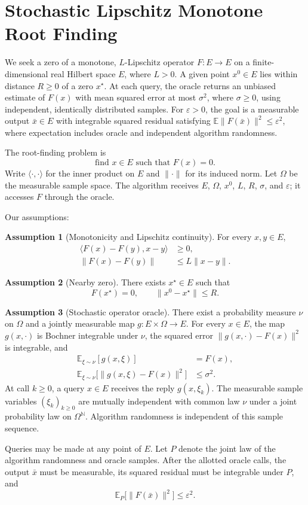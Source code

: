 \documentclass[10pt]{article}
\theoremstyle{definition}
\newtheorem{assumption}{Assumption}
\begin{document}
\section*{Stochastic Lipschitz Monotone Root Finding}
We seek a zero of a monotone, $L$-Lipschitz operator $F:E\to E$ on a finite-dimensional real Hilbert space $E$, where $L>0$. A given point $x^0\in E$ lies within distance $R\geq0$ of a zero $x^\star$. At each query, the oracle returns an unbiased estimate of $F(x)$ with mean squared error at most $\sigma^2$, where $\sigma\geq0$, using independent, identically distributed samples. For $\varepsilon>0$, the goal is a measurable output $\bar{x}\in E$ with integrable squared residual satisfying $\mathbb{E}\|F(\bar{x})\|^2\leq\varepsilon^2$, where expectation includes oracle and independent algorithm randomness.

The root-finding problem is
\[
\text{find }x\in E\text{ such that }F(x)=0.
\]
Write $\langle\cdot,\cdot\rangle$ for the inner product on $E$ and $\|\cdot\|$ for its induced norm. Let $\Omega$ be the measurable sample space. The algorithm receives $E$, $\Omega$, $x^0$, $L$, $R$, $\sigma$, and $\varepsilon$; it accesses $F$ through the oracle.

Our assumptions:
\begin{assumption}[Monotonicity and Lipschitz continuity]
For every $x,y\in E$,
\[
\begin{aligned}
\langle F(x)-F(y),x-y\rangle&\geq0,\\
\|F(x)-F(y)\|&\leq L\|x-y\|.
\end{aligned}
\]
\end{assumption}

\begin{assumption}[Nearby zero]
There exists $x^\star\in E$ such that
\[
F(x^\star)=0,
\qquad \|x^0-x^\star\|\leq R.
\]
\end{assumption}

\begin{assumption}[Stochastic operator oracle]
There exist a probability measure $\nu$ on $\Omega$ and a jointly measurable map $g:E\times\Omega\to E$. For every $x\in E$, the map $g(x,\cdot)$ is Bochner integrable under $\nu$, the squared error $\|g(x,\cdot)-F(x)\|^2$ is integrable, and
\[
\begin{aligned}
\mathbb{E}_{\xi\sim\nu}[g(x,\xi)]&=F(x),\\
\mathbb{E}_{\xi\sim\nu}\bigl[\|g(x,\xi)-F(x)\|^2\bigr]&\leq\sigma^2.
\end{aligned}
\]
At call $k\geq0$, a query $x\in E$ receives the reply $g(x,\xi_k)$. The measurable sample variables $(\xi_k)_{k\geq0}$ are mutually independent with common law $\nu$ under a joint probability law on $\Omega^{\mathbb{N}}$. Algorithm randomness is independent of this sample sequence.
\end{assumption}

Queries may be made at any point of $E$. Let $P$ denote the joint law of the algorithm randomness and oracle samples. After the allotted oracle calls, the output $\bar{x}$ must be measurable, its squared residual must be integrable under $P$, and
\[
\mathbb{E}_{P}\bigl[\|F(\bar{x})\|^2\bigr]\leq\varepsilon^2.
\]
\end{document}
